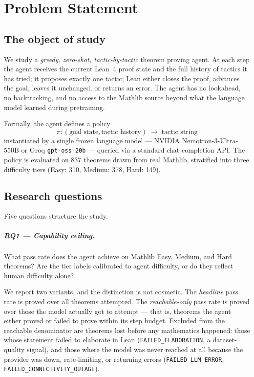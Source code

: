 \chapter{Problem Statement}
\label{chap:problem_statement}

\section{The object of study}

We study a \emph{greedy, zero-shot, tactic-by-tactic} theorem proving agent.
At each step the agent receives the current Lean~4 proof state and the full history
of tactics it has tried; it proposes exactly one tactic; Lean either closes the proof,
advances the goal, leaves it unchanged, or returns an error.
The agent has no lookahead, no backtracking, and no access to the Mathlib source
beyond what the language model learned during pretraining.

Formally, the agent defines a policy
\[
  \pi : (\text{goal state}, \text{tactic history}) \;\longrightarrow\; \text{tactic string}
\]
instantiated by a single frozen language model --- NVIDIA Nemotron-3-Ultra-550B
or Groq \texttt{gpt-oss-20b} --- queried via a standard chat completion API.
The policy is evaluated on 837 theorems drawn from real Mathlib,
stratified into three difficulty tiers (Easy: 310, Medium: 378, Hard: 149).

\section{Research questions}

Five questions structure the study.

\paragraph{RQ1 --- Capability ceiling.}
What pass rate does the agent achieve on Mathlib Easy, Medium, and Hard theorems?
Are the tier labels calibrated to agent difficulty, or do they reflect human difficulty alone?

We report two variants, and the distinction is not cosmetic.
The \emph{headline} pass rate is proved over all theorems attempted.
The \emph{reachable-only} pass rate is proved over those the model actually got to
attempt --- that is, theorems the agent either proved or failed to prove within its
step budget.
Excluded from the reachable denominator are theorems lost before any mathematics
happened: those whose statement failed to elaborate in Lean
(\texttt{FAILED\_ELABORATION}, a dataset-quality signal), and those where the model
was never reached at all because the provider was down, rate-limiting, or returning
errors (\texttt{FAILED\_LLM\_ERROR}, \texttt{FAILED\_CONNECTIVITY\_OUTAGE}).

